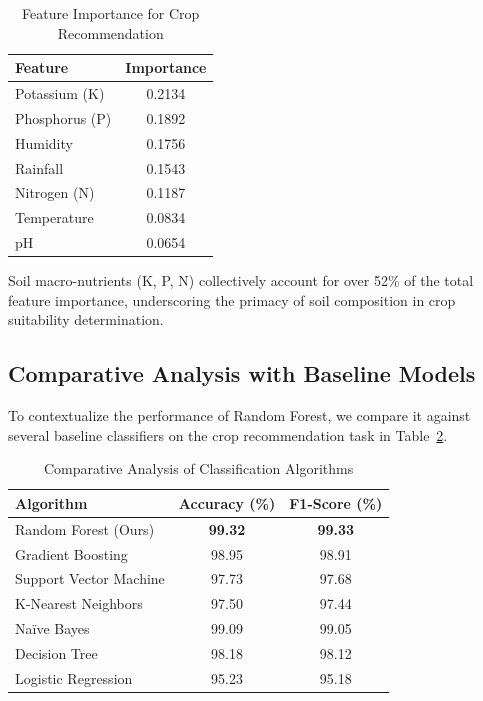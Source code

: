\begin{table}[htbp]
\caption{Feature Importance for Crop Recommendation}
\label{tab:feature_importance}
\centering
\begin{tabular}{@{}lc@{}}
\toprule
\textbf{Feature} & \textbf{Importance} \\
\midrule
Potassium (K) & 0.2134 \\
Phosphorus (P) & 0.1892 \\
Humidity & 0.1756 \\
Rainfall & 0.1543 \\
Nitrogen (N) & 0.1187 \\
Temperature & 0.0834 \\
pH & 0.0654 \\
\bottomrule
\end{tabular}
\end{table}

Soil macro-nutrients (K, P, N) collectively account for over 52\% of the total feature importance, underscoring the primacy of soil composition in crop suitability determination.

\subsection{Comparative Analysis with Baseline Models}
To contextualize the performance of Random Forest, we compare it against several baseline classifiers on the crop recommendation task in Table~\ref{tab:comparison}.

\begin{table}[htbp]
\caption{Comparative Analysis of Classification Algorithms}
\label{tab:comparison}
\centering
\begin{tabular}{@{}lcc@{}}
\toprule
\textbf{Algorithm} & \textbf{Accuracy (\%)} & \textbf{F1-Score (\%)} \\
\midrule
Random Forest (Ours) & \textbf{99.32} & \textbf{99.33} \\
Gradient Boosting & 98.95 & 98.91 \\
Support Vector Machine & 97.73 & 97.68 \\
K-Nearest Neighbors & 97.50 & 97.44 \\
Na\"ive Bayes & 99.09 & 99.05 \\
Decision Tree & 98.18 & 98.12 \\
Logistic Regression & 95.23 & 95.18 \\
\bottomrule
\end{tabular}
\end{table}

